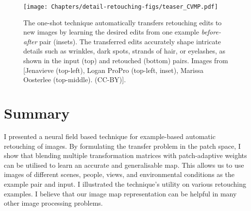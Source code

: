 \begin{figure}
  \texttt{[image: Chapters/detail-retouching-figs/teaser\_CVMP.pdf]}
  \caption{The one-shot technique automatically transfers retouching edits to new images by learning the desired edits from one example \textit{before-after} pair (insets). The transferred edits accurately shape intricate details such as wrinkles, dark spots, strands of hair, or eyelashes, as shown in the input (top) and retouched (bottom) pairs. Images from [Jenavieve (top-left), Logan ProPro (top-left, inset), Marissa Oosterlee (top-middle). (CC-BY)].}
  \label{fig:teaser}
\end{figure}
















\section{Summary}
I presented a neural field based technique for example-based automatic retouching of images. By formulating the transfer problem in the patch space, I show that blending multiple transformation matrices with patch-adaptive weights can be utilised to learn an accurate and generalisable map. This allows us to use images of different scenes, people, views, and environmental conditions as the example pair and input. I illustrated the technique's utility on various retouching examples. I believe that our image map representation can be helpful in many other image processing problems.


